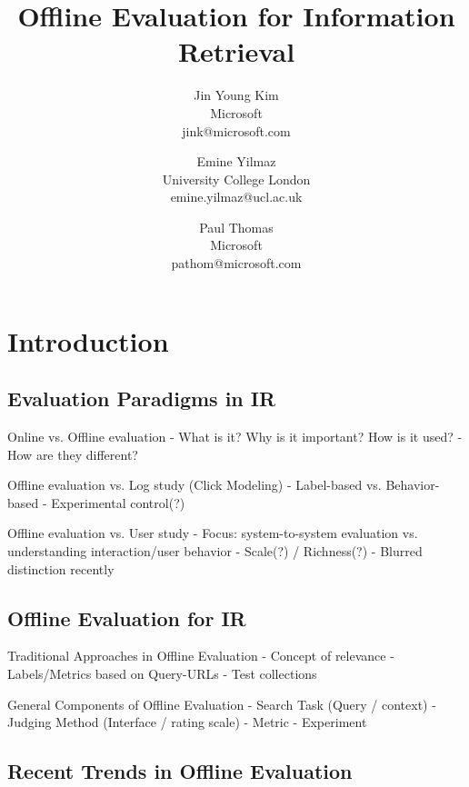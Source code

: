 \documentclass[openany]{now} %
\title{Offline Evaluation for Information Retrieval}
\author{
	Jin Young Kim \\
	Microsoft \\
	jink@microsoft.com
	\and
	Emine Yilmaz \\
	University College London \\
	emine.yilmaz@ucl.ac.uk
	\and
	Paul Thomas \\
	Microsoft \\
	pathom@microsoft.com
}
\begin{document}

\frontmatter  %

\maketitle

\tableofcontents

\mainmatter

\begin{abstract}
	
\end{abstract}

\chapter{Introduction}
\label{c-intro}

\section{Evaluation Paradigms in IR}


Online vs. Offline evaluation
- What is it? Why is it important? How is it used?
- How are they different?
\cite{INR-XYZ}\cite{INR-009} 

Offline evaluation vs. Log study (Click Modeling)
- Label-based vs. Behavior-based
- Experimental control(?)

Offline evaluation vs. User study
- Focus: system-to-system evaluation vs. understanding interaction/user behavior
- Scale(?) / Richness(?)
- Blurred distinction recently
\cite{Bron:2013}
\cite{Liu:2014}
\cite{Shah:2011}


\section{Offline Evaluation for IR}

Traditional Approaches in Offline Evaluation
- Concept of relevance 
- Labels/Metrics based on Query-URLs
- Test collections 
\cite{borlund2003} \cite{cleverdon67} \cite{voor:trec05}

General Components of Offline Evaluation
-	Search Task (Query / context)
-	Judging Method (Interface / rating scale) 
-	Metric
-	Experiment

\section{Recent Trends in Offline Evaluation}
\end{document}
